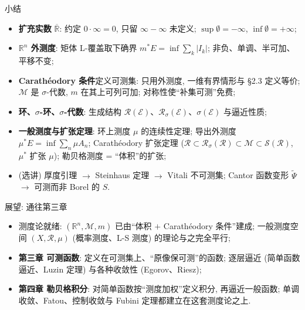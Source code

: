 
\begin{frame}{小结}

\begin{itemize}
\item \textbf{扩充实数} $\overline{\mathbb{R}}$: 约定 $0 \cdot \infty = 0$, 只留 $\infty - \infty$ 未定义; $\sup\emptyset = -\infty$, $\inf\emptyset = +\infty$;
\pause
\item \textbf{$\mathbb{R}^n$ 外测度}: 矩体 L-覆盖取下确界 $m^*E = \inf \sum_k |I_k|$; 非负、单调、半可加、平移不变;
\pause
\item \textbf{Carath\'{e}odory 条件}定义可测集: 只用外测度, 一维有界情形与 §2.3 定义等价; $\mathscr{M}$ 是 $\sigma$-代数, $m$ 在其上可列可加; 对称性使``补集可测''免费;
\pause
\item \textbf{环、$\sigma$-环、$\sigma$-代数}: 生成结构 $\mathscr{R}(\mathscr{E})$、$\mathscr{R}_\sigma(\mathscr{E})$、$\sigma(\mathscr{E})$ 与逼近性质;
\pause
\item \textbf{一般测度与扩张定理}: 环上测度 $\mu$ 的连续性定理; 导出外测度 $\mu^* E = \inf\sum_n \mu A_n$; Carath\'{e}odory 扩张定理 ($\mathscr{R} \subset \mathscr{R}_\sigma(\mathscr{R}) \subset \mathscr{M} \subset \mathscr{S}(\mathscr{R})$, $\mu^*$ 扩张 $\mu$); 勒贝格测度 = ``体积''的扩张;
\pause
\item (选讲) 厚度引理 $\to$ Steinhaus 定理 $\to$ Vitali 不可测集; Cantor 函数变形 $\widetilde{\Psi}$ $\to$ 可测而非 Borel 的 $S$.
\end{itemize}

\end{frame}


\begin{frame}{展望: 通往第三章}

\begin{itemize}
\item 测度论就绪: $(\mathbb{R}^n, \mathscr{M}, m)$ 已由``体积 $+$ Carath\'{e}odory 条件''建成; 一般测度空间 $(X, \mathscr{R}, \mu)$ (概率测度、L-S 测度) 的理论与之完全平行;
\pause
\item \textbf{第三章 可测函数}: 定义在可测集上、``原像保可测''的函数; 逐层逼近 (简单函数逼近、Luzin 定理) 与各种收敛性 (Egorov、Riesz);
\pause
\item \textbf{第四章 勒贝格积分}: 对简单函数按``测度加权''定义积分, 再逼近一般函数; 单调收敛、Fatou、控制收敛与 Fubini 定理都建立在这套测度论之上.
\end{itemize}

\end{frame}





